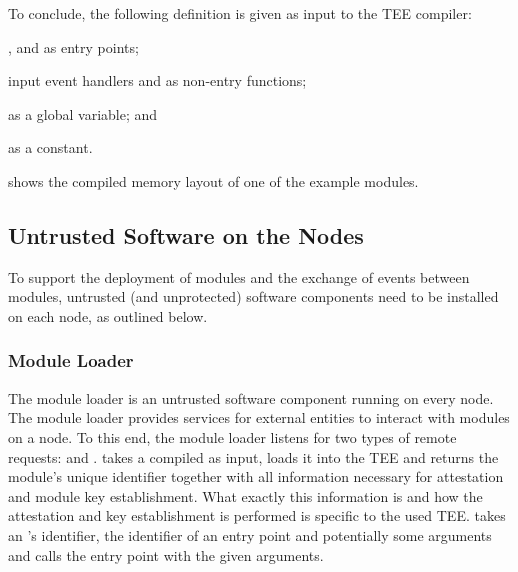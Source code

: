 To conclude, the following \protmod{} definition is given as input to the
\ac{TEE} compiler:
%
\begin{paraenum}
%
  \item \setkey, \attest{} and \handleinput{} as entry points;
%
  \item input event handlers and \handleoutput{} as non-entry functions;
%
  \item \conntab{} as a global variable; and
%
  \item \cbtab{} as a constant.
%
\end{paraenum}
%
 shows the compiled memory layout of one of the
example modules.


\subsection{Untrusted Software on the Nodes}
%
\label{concept:untrusted-sw}
%
To support the deployment of modules and the exchange of events between modules,
untrusted (and unprotected) software components need to be installed on each
node, as outlined below.

\subsubsection{Module Loader} \label{concept:module-loader}
%
The module loader is an untrusted software component running on every node.
The module loader provides services for external entities to interact with
modules on a node.  To this end, the module loader listens for two types of
remote requests: \loadmodule{} and \callentry.  \loadmodule{} takes a
compiled \protmod{} as input, loads it into the \ac{TEE} and returns the
module's unique identifier together with all information necessary for
attestation and module key establishment.  What exactly this information is
and how the attestation and key establishment is performed is specific to
the used \ac{TEE}.  \callentry{} takes an \protmod's identifier, the
identifier of an entry point and potentially some arguments and calls the
entry point with the given arguments.

